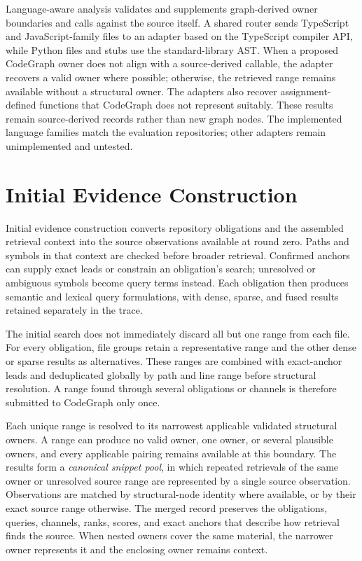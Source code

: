 Language-aware analysis validates and supplements graph-derived owner boundaries and calls against the source itself. A shared router sends TypeScript and JavaScript-family files to an adapter based on the TypeScript compiler API, while Python files and stubs use the standard-library AST. When a proposed CodeGraph owner does not align with a source-derived callable, the adapter recovers a valid owner where possible; otherwise, the retrieved range remains available without a structural owner. The adapters also recover assignment-defined functions that CodeGraph does not represent suitably. These results remain source-derived records rather than new graph nodes. The implemented language families match the evaluation repositories; other adapters remain unimplemented and untested.

\section{Initial Evidence Construction}\label{sec:initial-evidence-construction}

Initial evidence construction converts repository obligations and the assembled retrieval context into the source observations available at round zero. Paths and symbols in that context are checked before broader retrieval. Confirmed anchors can supply exact leads or constrain an obligation's search; unresolved or ambiguous symbols become query terms instead. Each obligation then produces semantic and lexical query formulations, with dense, sparse, and fused results retained separately in the trace.

The initial search does not immediately discard all but one range from each file. For every obligation, file groups retain a representative range and the other dense or sparse results as alternatives. These ranges are combined with exact-anchor leads and deduplicated globally by path and line range before structural resolution. A range found through several obligations or channels is therefore submitted to CodeGraph only once.

Each unique range is resolved to its narrowest applicable validated structural owners. A range can produce no valid owner, one owner, or several plausible owners, and every applicable pairing remains available at this boundary. The results form a \emph{canonical snippet pool}, in which repeated retrievals of the same owner or unresolved source range are represented by a single source observation. Observations are matched by structural-node identity where available, or by their exact source range otherwise. The merged record preserves the obligations, queries, channels, ranks, scores, and exact anchors that describe how retrieval finds the source. When nested owners cover the same material, the narrower owner represents it and the enclosing owner remains context.

